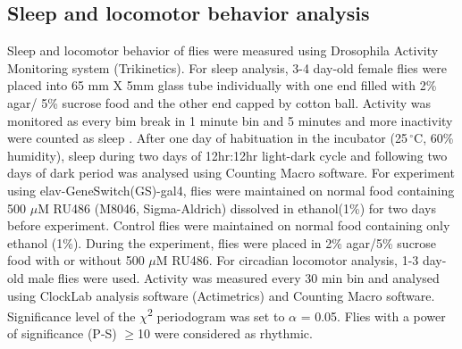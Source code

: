 \subsection*{Sleep and locomotor behavior analysis}

Sleep and locomotor behavior of flies were measured using Drosophila Activity Monitoring system (Trikinetics).
For sleep analysis, 3-4 day-old female flies were placed into 65 mm X 5mm glass tube individually with one end filled with 2\% agar/ 5\% sucrose food and the other end capped by cotton ball.
Activity was monitored as every bim break in 1 minute bin and 5 minutes and more inactivity were counted as sleep \cite{Shaw:2000ui}.
After one day of habituation in the incubator (25$\,^{\circ}\mathrm{C}$, 60\% humidity), sleep during two days of 12hr:12hr light-dark cycle and following two days of dark period was analysed using Counting Macro software\cite{pfeiffenberger:2010ab}.
For experiment using elav-GeneSwitch(GS)-gal4, flies were maintained on normal food containing 500 $\mu$M RU486 (M8046, Sigma-Aldrich) dissolved in ethanol(1\%) for two days before experiment.
Control flies were maintained on normal food containing only ethanol (1\%).
During the experiment, flies were placed in 2\% agar/5\% sucrose food with or without 500 $\mu$M RU486. 
For circadian locomotor analysis, 1-3 day-old male flies were used. Activity was measured every 30 min bin and analysed using ClockLab analysis software (Actimetrics) and Counting Macro software. Significance level of the $\chi$\textsuperscript{2} periodogram was set to $\alpha$ = 0.05.
Flies with a power of significance (P-S) $\geq$10 were considered as rhythmic.
  
  
  
  
  
  
  
  
  
  
  
  
  
  